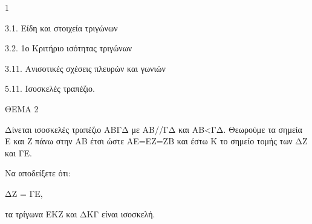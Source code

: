 \begin{ylh}{1}
    \item 3.1. Είδη και στοιχεία τριγώνων
    \item 3.2. 1ο Κριτήριο ισότητας τριγώνων
    \item 3.11. Ανισοτικές σχέσεις πλευρών και γωνιών
    \item 5.11. Ισοσκελές τραπέζιο.
\end{ylh}

ΘΕΜΑ 2

Δίνεται ισοσκελές τραπέζιο ΑΒΓΔ με ΑΒ//ΓΔ και ΑΒ\textless ΓΔ. Θεωρούμε τα σημεία Ε και Ζ πάνω στην ΑΒ έτσι ώστε ΑΕ=ΕΖ=ΖΒ και έστω Κ το σημείο τομής των ΔΖ και ΓΕ.

Να αποδείξετε ότι:

\begin{alist}
\item ΔΖ = ΓΕ, 

\item τα τρίγωνα ΕΚΖ και ΔΚΓ είναι ισοσκελή. 
\end{alist}
